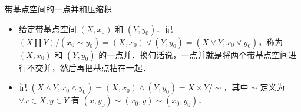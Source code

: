 \begin{definition}{带基点空间的一点并和压缩积}\label{Topo9_def1}
\begin{itemize}
\item 给定带基点空间 $(X, x_0)$ 和 $(Y, y_0)$．记 $(X\amalg Y)/(x_0\sim y_0)=(X, x_0)\vee(Y, y_0)=(X\vee Y, x_0\vee y_0)$，称为 $(X, x_0)$ 和 $(Y, y_0)$ 的一点并．换句话说，一点并就是将两个带基点空间进行不交并，然后再把基点粘在一起．

\item 记 $(X\land Y, x_0\land y_0)=(X, x_0)\land(Y, y_0)=X\times Y/\sim$，其中 $\sim$ 定义为 $\forall x\in X, y\in Y$ 有 $ (x, y_0)\sim(x_0, y)\sim(x_0, y_0)$．

\end{itemize}
\end{definition}
